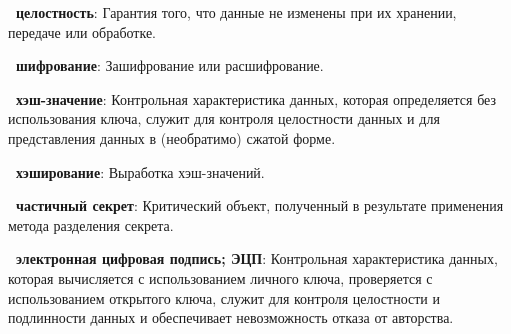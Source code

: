 {\bf \thedefctr~целостность}:
Гарантия того, что данные не изменены при их хранении, передаче или обработке. 

{\bf \thedefctr~шифрование}:
Зашифрование или расшифрование.

{\bf \thedefctr~хэш-значение}:
Контрольная характеристика данных, которая определяется без использования ключа,
служит для контроля целостности данных и для представления данных в (необратимо)
сжатой форме.

{\bf \thedefctr~хэширование}:
Выработка хэш-значений.

{\bf \thedefctr~частичный секрет}:
Критический объект, 
полученный в результате применения метода разделения секрета.

{\bf \thedefctr~электронная цифровая подпись; ЭЦП}:
Контрольная характеристика данных, которая вычисляется с использованием личного
ключа, проверяется с использованием открытого ключа, служит для контроля
целостности и подлинности данных и обеспечивает невозможность отказа от
авторства.

